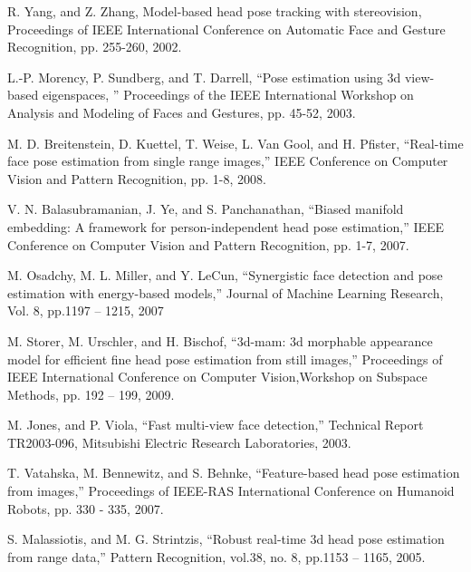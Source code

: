 \begin{thebibliography}{}
%
%



R. Yang, and Z. Zhang, Model-based head pose tracking with stereovision, Proceedings of IEEE International Conference on Automatic Face and Gesture Recognition, pp. 255-260, 2002.

L.-P. Morency, P. Sundberg, and T. Darrell, “Pose estimation using 3d view-based eigenspaces, ” Proceedings of the IEEE International Workshop on Analysis and Modeling of Faces and Gestures, pp. 45-52, 2003.

M. D. Breitenstein, D. Kuettel, T. Weise, L. Van Gool, and H. Pfister, “Real-time face pose estimation from single range images,” IEEE Conference on Computer Vision and Pattern Recognition, pp. 1-8, 2008.

V. N. Balasubramanian, J. Ye, and S. Panchanathan, “Biased manifold embedding: A framework for person-independent head pose estimation,” IEEE Conference on Computer Vision and Pattern Recognition, pp. 1-7,  2007.

M. Osadchy, M. L. Miller, and Y. LeCun, “Synergistic face detection and pose estimation with energy-based models,” Journal of Machine Learning Research, Vol. 8, pp.1197 – 1215, 2007

M. Storer, M. Urschler, and H. Bischof, “3d-mam: 3d morphable appearance model for efficient fine head pose estimation from still images,” Proceedings of IEEE International Conference on Computer Vision,Workshop on Subspace Methods, pp. 192 – 199, 2009.

M. Jones, and P. Viola, “Fast multi-view face detection,” Technical Report TR2003-096, Mitsubishi Electric Research Laboratories, 2003.

T. Vatahska, M. Bennewitz, and S. Behnke, “Feature-based head pose estimation from images,” Proceedings of IEEE-RAS International Conference on Humanoid Robots, pp. 330 - 335, 2007.

S. Malassiotis, and M. G. Strintzis, “Robust real-time 3d head pose estimation from range data,” Pattern Recognition, vol.38, no. 8, pp.1153 – 1165, 2005.


\end{thebibliography}
